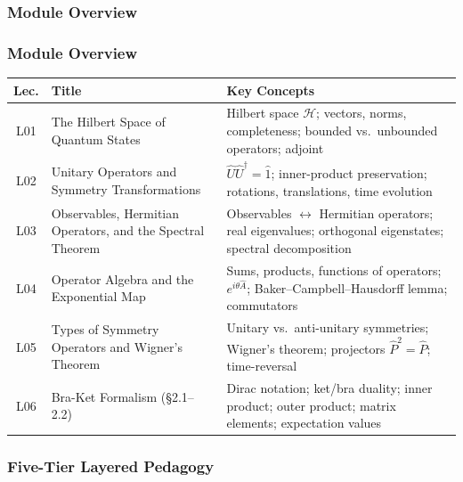\documentclass[11pt,a4paper]{article}
\begin{document}
\subsubsection*{Module Overview}

\subsubsection*{Module Overview}

\begin{center}
\begin{tabularx}{\textwidth}{clX}
\toprule
\textbf{Lec.} & \textbf{Title} & \textbf{Key Concepts}\\
\midrule
L01 & The Hilbert Space of Quantum States &
    Hilbert space $\mathcal{H}$; vectors, norms, completeness; bounded vs.\ unbounded operators; adjoint\\
L02 & Unitary Operators and Symmetry Transformations &
    $\hat{U}\hat{U}^\dagger=\hat{1}$; inner-product preservation; rotations, translations, time evolution\\
L03 & Observables, Hermitian Operators, and the Spectral Theorem &
    Observables $\leftrightarrow$ Hermitian operators; real eigenvalues; orthogonal eigenstates; spectral decomposition\\
L04 & Operator Algebra and the Exponential Map &
    Sums, products, functions of operators; $e^{i\theta\hat{A}}$; Baker--Campbell--Hausdorff lemma; commutators\\
L05 & Types of Symmetry Operators and Wigner's Theorem &
    Unitary vs.\ anti-unitary symmetries; Wigner's theorem; projectors $\hat{P}^2=\hat{P}$; time-reversal\\
L06 & Bra-Ket Formalism (\S2.1--2.2) &
    Dirac notation; ket/bra duality; inner product; outer product; matrix elements; expectation values\\
\bottomrule
\end{tabularx}
\end{center}

\subsubsection*{Five-Tier Layered Pedagogy}
\end{document}
